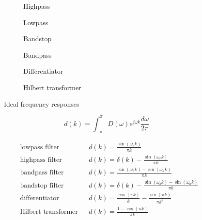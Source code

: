 \begin{figure}[htp]
\begin{subfigure}{0.49\textwidth}
\centering
\newcommand{\coordinates}{coordinates {
(-3.14,1) (-1.569,1) (-1.571,0)
( 1.571,0) (1.569,1) ( 3.14,1)
};}

\caption{Highpass}
\end{subfigure}
\begin{subfigure}{0.49\textwidth}
\centering
\newcommand{\coordinates}{coordinates {(-3.14,0) (-1.569,0) (-1.571,1) (1.571,1) (1.569,0) (3.14,0)};}

\caption{Lowpass}
\end{subfigure}

\begin{subfigure}{0.49\textwidth}
\centering
\newcommand{\coordinates}{coordinates {
(-3.14,1) (-2.001,1) (-1.999,0) (-1.001,0) (-0.999,1)
(0.999,1) ( 1.001,0) ( 1.999,0) ( 2.001,1) ( 3.14,1)};}

\caption{Bandstop}
\end{subfigure}
\begin{subfigure}{0.49\textwidth}
\centering
\newcommand{\coordinates}{coordinates {
(-3.14,0) (-2.001,0) (-1.999,1) (-1.001,1) (-0.999,0)
(0.999,0) (1.001,1) (1.999,1) (2.001,0) ( 3.14,0)};}

\caption{Bandpass}
\end{subfigure}

\begin{subfigure}{0.49\textwidth}
\centering
\newcommand{\coordinates}{coordinates {(-3.14,-1) (3.14,1)};}

\caption{Differentiator}
\end{subfigure}
\begin{subfigure}{0.49\textwidth}
\centering
\newcommand{\coordinates}{coordinates {(-3.14,1) (-0.001,1) (0.001,-1) (3.14,-1) };}

\caption{Hilbert transformer}
\end{subfigure}

\caption{Ideal frequency responses}
\label{fig:freqresp}
\end{figure}


\begin{equation}
d(k) = \int_{-\pi}^{\pi}D(\omega) e^{j\omega k}\frac{d\omega}{2\pi} \label{eq:impresp}
\end{equation}

\begin{align*}
&\text{lowpass filter} && d(k) = \frac{\sin(\omega_ck)}{\pi k} \\
&\text{highpass filter} && d(k) = \delta(k) - \frac{\sin(\omega_ck)}{\pi k} \\
&\text{bandpass filter} && d(k) = \frac{\sin(\omega_bk) - \sin(\omega_ak)}{\pi k} \\
&\text{bandstop filter} && d(k) = \delta(k) - \frac{\sin(\omega_bk) - \sin(\omega_ak)}{\pi k} \\
&\text{differentiator} && d(k) = \frac{\cos(\pi k)}{k}-\frac{\sin(\pi k)}{\pi k^2}\\
&\text{Hilbert transformer} && d(k) = \frac{1-\cos(\pi k)}{\pi k}
\end{align*}

